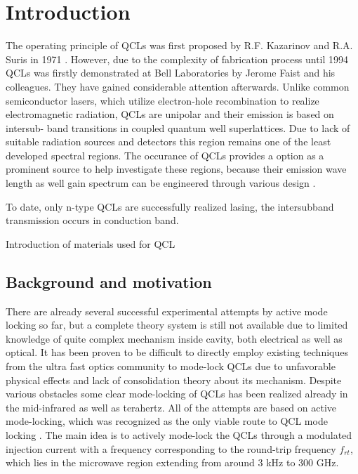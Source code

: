 \documentclass[11pt,final]{scrbook}
\begin{document}
\tableofcontents

\chapter{Introduction}
The operating principle of QCLs was first proposed by R.F. Kazarinov and R.A. Suris in 1971 \cite{kazarinov1971possibility}. However, due to the complexity of fabrication process until 1994 QCLs was firstly demonstrated at Bell Laboratories by Jerome Faist and his colleagues\cite{faist1994quantum}. They have gained considerable attention afterwards. Unlike common semiconductor lasers, which utilize electron-hole recombination to realize electromagnetic radiation, QCLs are unipolar and their emission is based on intersub- band transitions in coupled quantum well superlattices\cite{williams2007terahertz}. Due to lack of suitable radiation sources and detectors this region remains one of the least developed spectral regions. The occurance of QCLs provides a option as a prominent source to help investigate these regions, because their emission wave length as well gain spectrum can be engineered through various design \cite{gmachl2002ultra}. 

To date, only n-type QCLs are successfully realized lasing, the intersubband transmission occurs in conduction band. 

Introduction of materials used for QCL

\section{Background and motivation}
There are already several successful experimental attempts by active mode locking so far, but a complete theory system is still not available due to limited knowledge of quite complex mechanism inside cavity, both electrical as well as optical. It has been proven to be difficult to directly employ existing techniques from the ultra fast optics community to mode-lock QCLs due to unfavorable physical effects and lack of consolidation theory about its mechanism. Despite various obstacles some clear mode-locking of QCLs has been realized already in the mid-infrared as well as terahertz. All of the attempts are based on active mode-locking, which was recognized as the only viable route to QCL mode locking \cite{revin2016active}. The main idea is to actively mode-lock the QCLs through a modulated injection current with a frequency corresponding to the round-trip frequency $f_{rt}$, which lies in the microwave region extending from around 3 kHz to 300 GHz.
\end{document}
